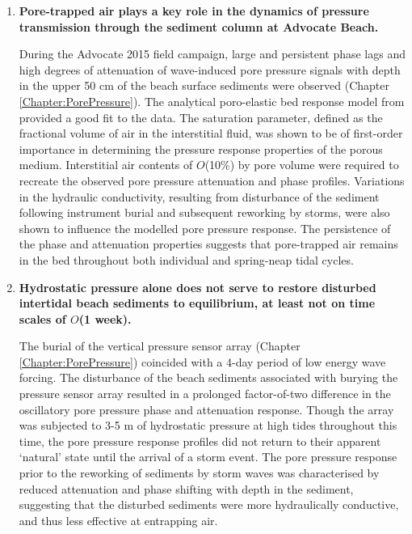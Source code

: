 \begin{enumerate}	
	
	\item \textbf{Pore-trapped air plays a key role in the dynamics of pressure transmission through the sediment column at Advocate Beach.}
	
	During the Advocate 2015 field campaign, large and persistent phase lags and high degrees of attenuation of wave-induced pore pressure signals with depth in the upper 50 cm of the beach surface sediments were observed (Chapter \ref{Chapter:PorePressure}). The analytical poro-elastic bed response model from \citet{Yamamoto_etal1978} provided a good fit to the data. The saturation parameter, defined as the fractional volume of air in the interstitial fluid, was shown to be of first-order importance in determining the pressure response properties of the porous medium. Interstitial air contents of $O$(10\%) by pore volume were required to recreate the observed pore pressure attenuation and phase profiles. Variations in the hydraulic conductivity, resulting from disturbance of the sediment following instrument burial and subsequent reworking by storms, were also shown to influence the modelled pore pressure response. The persistence of the phase and attenuation properties suggests that pore-trapped air remains in the bed throughout both individual and spring-neap tidal cycles. 
		
	
	\item \textbf{Hydrostatic pressure alone does not serve to restore disturbed intertidal beach sediments to equilibrium, at least not on time scales of $O$(1 week).}
	
	The burial of the vertical pressure sensor array (Chapter \ref{Chapter:PorePressure}) coincided with a 4-day period of low energy wave forcing. The disturbance of the beach sediments associated with burying the pressure sensor array resulted in a prolonged factor-of-two difference in the oscillatory pore pressure phase and attenuation response. Though the array was subjected to 3-5 m of hydrostatic pressure at high tides throughout this time, the pore pressure response profiles did not return to their apparent `natural' state until the arrival of a storm event. The pore pressure response prior to the reworking of sediments by storm waves was characterised by reduced attenuation and phase shifting with depth in the sediment, suggesting that the disturbed sediments were more hydraulically conductive, and thus less effective at entrapping air.
	

\end{enumerate}
